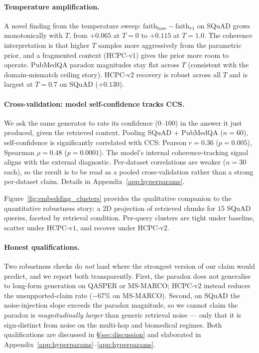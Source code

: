 \paragraph{Temperature amplification.}
A novel finding from the temperature sweep:
$\textrm{faith}_{\textrm{base}} - \textrm{faith}_{\textrm{v1}}$ on
SQuAD grows monotonically with $T$, from $+0.065$ at $T=0$ to
$+0.115$ at $T=1.0$. The coherence interpretation is that higher $T$
samples more aggressively from the parametric prior, and a fragmented
context (HCPC-v$1$) gives the prior more room to operate. PubMedQA
paradox magnitudes stay flat across $T$ (consistent with the
domain-mismatch ceiling story). HCPC-v$2$ recovery is robust across
all $T$ and is largest at $T=0.7$ on SQuAD ($+0.130$).

\paragraph{Cross-validation: model self-confidence tracks CCS.}
We ask the same generator to rate its confidence ($0$--$100$) in the
answer it just produced, given the retrieved context. Pooling SQuAD +
PubMedQA ($n=60$), self-confidence is significantly correlated with
CCS: Pearson $r=0.36$ ($p=0.005$), Spearman $\rho=0.48$ ($p=0.0001$).
The model's internal coherence-tracking signal aligns with the
external diagnostic. Per-dataset correlations are weaker ($n=30$
each), so the result is to be read as a pooled cross-validation rather
than a strong per-dataset claim. Details in
Appendix~\ref{app:hyperparams}.



Figure~\ref{fig:embedding_clusters} provides the qualitative companion
to the quantitative robustness story: a $2$D projection of retrieved
chunks for $15$ SQuAD queries, faceted by retrieval condition. Per-query
clusters are tight under baseline, scatter under HCPC-v$1$, and
recover under HCPC-v$2$.

\paragraph{Honest qualifications.}
Two robustness checks do \emph{not} land where the strongest version of
our claim would predict, and we report both transparently. First, the
paradox does not generalise to long-form generation on QASPER or
MS-MARCO; HCPC-v$2$ instead reduces the unsupported-claim rate
($-67\%$ on MS-MARCO). Second, on SQuAD the noise-injection slope
exceeds the paradox magnitude, so we cannot claim the paradox is
\emph{magnitudinally larger} than generic retrieval noise --- only
that it is sign-distinct from noise on the multi-hop and biomedical
regimes. Both qualifications are discussed in
\S\ref{sec:discussion} and elaborated in
Appendix~\ref{app:hyperparams}--\ref{app:hyperparams}.
